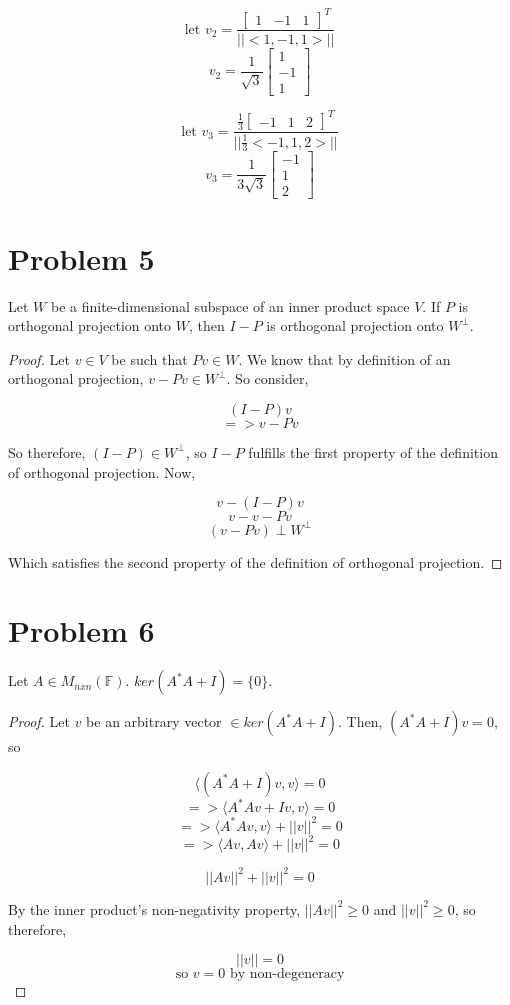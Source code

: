 \documentclass{article}
\begin{document}
\[ \text{let } v_2 = \frac{\begin{bmatrix} 1 & -1 & 1 \end{bmatrix}^T}{||<1, -1, 1>||} \]
\[ v_2 = \frac{1}{\sqrt{3}} \begin{bmatrix} 1 \\ -1 \\ 1 \end{bmatrix} \]

\[ \text{let } v_3 = \frac{\frac{1}{3} \begin{bmatrix} -1 & 1 & 2 \end{bmatrix}^T}{||\frac{1}{3}<-1, 1, 2>||} \]
\[ v_3 = \frac{1}{3 \sqrt{3}} \begin{bmatrix} -1 \\ 1 \\ 2 \end{bmatrix} \]

\section*{Problem 5}
Let $W$ be a finite-dimensional subspace of an inner product space $V$. If $P$ is orthogonal projection onto $W$, then $I - P$ is orthogonal projection onto $W^\perp$.

\begin{proof}
Let $v \in V$ be such that $Pv \in W$. We know that by definition of an orthogonal projection, $v - Pv \in W^{\perp}$. So consider,

\[ (I - P)v \]
\[ => v - Pv \]

So therefore, $(I - P) \in W^{\perp}$, so $I - P$ fulfills the first property of the definition of orthogonal projection. Now,

\[ v - (I - P)v \]
\[ v - v - Pv \]
\[ (v - Pv) \perp W^{\perp} \]

Which satisfies the second property of the definition of orthogonal projection.
\end{proof}

\section*{Problem 6}
Let $A \in M_{nxn}(\mathbb{F})$. $ker(A^*A + I) = \{ 0 \}$. 

\begin{proof}
Let $v$ be an arbitrary vector $\in ker(A^*A + I)$. Then, $(A^*A + I)v = 0$, so

\[ \langle (A^*A + I)v, v \rangle = 0 \]
\[ => \langle A^*Av + Iv, v \rangle = 0 \]
\[ => \langle A^*Av, v \rangle + ||v||^2 = 0 \]
\[ => \langle Av, Av \rangle + ||v||^2 = 0 \]

\[ ||Av||^2 + ||v||^2 = 0 \]

By the inner product's non-negativity property, $||Av||^2 \ge 0$ and $||v||^2 \ge 0$, so therefore,

\[ ||v|| = 0 \]
\[ \text{so } v = 0 \text{ by non-degeneracy} \]

\end{proof}
\end{document}
